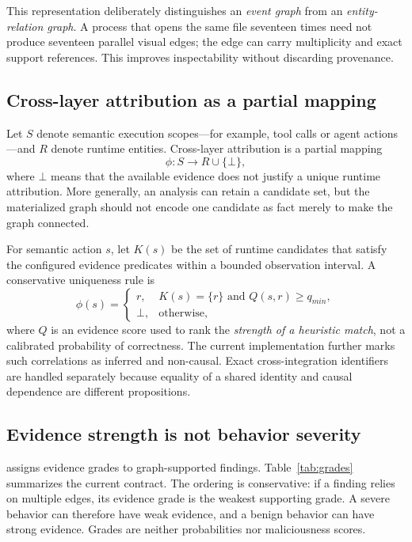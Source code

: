 This representation deliberately distinguishes an \emph{event graph} from an \emph{entity-relation graph}. A process that opens the same file seventeen times need not produce seventeen parallel visual edges; the edge can carry multiplicity and exact support references. This improves inspectability without discarding provenance.

\subsection{Cross-layer attribution as a partial mapping}
Let $S$ denote semantic execution scopes---for example, tool calls or agent actions---and $R$ denote runtime entities. Cross-layer attribution is a partial mapping
\begin{equation}
\phi:S\rightarrow R\cup\{\bot\},
\end{equation}
where $\bot$ means that the available evidence does not justify a unique runtime attribution. More generally, an analysis can retain a candidate set, but the materialized graph should not encode one candidate as fact merely to make the graph connected.

For semantic action $s$, let $K(s)$ be the set of runtime candidates that satisfy the configured evidence predicates within a bounded observation interval. A conservative uniqueness rule is
\begin{equation}
\phi(s)=
\begin{cases}
r, & K(s)=\{r\}\text{ and }Q(s,r)\ge q_{min},\\
\bot, & \text{otherwise},
\end{cases}
\label{eq:phi}
\end{equation}
where $Q$ is an evidence score used to rank the \emph{strength of a heuristic match}, not a calibrated probability of correctness. The current implementation further marks such correlations as inferred and non-causal. Exact cross-integration identifiers are handled separately because equality of a shared identity and causal dependence are different propositions.

\subsection{Evidence strength is not behavior severity}
\system assigns evidence grades to graph-supported findings. Table~\ref{tab:grades} summarizes the current contract. The ordering is conservative: if a finding relies on multiple edges, its evidence grade is the weakest supporting grade. A severe behavior can therefore have weak evidence, and a benign behavior can have strong evidence. Grades are neither probabilities nor maliciousness scores.

